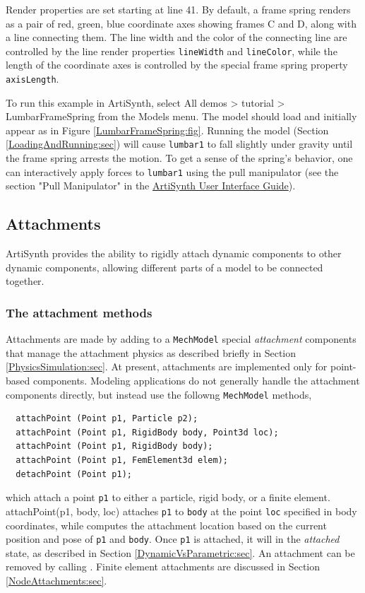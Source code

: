 Render properties are set starting at line 41. By default, a frame
spring renders as a pair of red, green, blue coordinate axes showing
frames C and D, along with a line connecting them. The line width and
the color of the connecting line are controlled by the line render
properties {\tt lineWidth} and {\tt lineColor}, while the length of
the coordinate axes is controlled by the special frame spring property
{\tt axisLength}.

To run this example in ArtiSynth, select {\sf All demos > tutorial >
LumbarFrameSpring} from the {\sf Models} menu. The model should load
and initially appear as in Figure \ref{LumbarFrameSpring:fig}.
Running the model (Section \ref{LoadingAndRunning:sec}) will cause
{\tt lumbar1} to fall slightly under gravity until the frame spring
arrests the motion. To get a sense of the spring's behavior, one can
interactively apply forces to {\tt lumbar1} using the pull manipulator
(see the section "Pull Manipulator" in the
\href{http://www.artisynth.org/doc/html/uiguide/uiguide.html}{
ArtiSynth User Interface Guide}).

\subsection{Attachments}
\label{Attachments:sec}

ArtiSynth provides the ability to rigidly attach dynamic components to
other dynamic components, allowing different parts of a model to be
connected together.

\subsubsection{The attachment methods}

Attachments are made by adding to a {\tt MechModel} special {\it
attachment} components that manage the attachment physics as described
briefly in Section
\ref{PhysicsSimulation:sec}. At present, attachments
are implemented only for point-based components.  Modeling
applications do not generally handle the attachment components
directly, but instead use the followng {\tt MechModel} methods,
%
\begin{lstlisting}
  attachPoint (Point p1, Particle p2);
  attachPoint (Point p1, RigidBody body, Point3d loc);
  attachPoint (Point p1, RigidBody body);
  attachPoint (Point p1, FemElement3d elem);
  detachPoint (Point p1);
\end{lstlisting}
%
which attach a point {\tt p1} to either a particle, rigid body, or a
finite element.
{attachPoint(p1, body, loc)} attaches {\tt p1} to {\tt body} at the
point {\tt loc} specified in body coordinates, while
 computes the attachment location based on the current position
and pose of {\tt p1} and {\tt body}.  Once {\tt p1} is attached, it
will in the {\it attached} state, as described in Section
\ref{DynamicVsParametric:sec}.
An attachment can be removed by calling 
.
Finite element attachments are
discussed in Section \ref{NodeAttachments:sec}.

